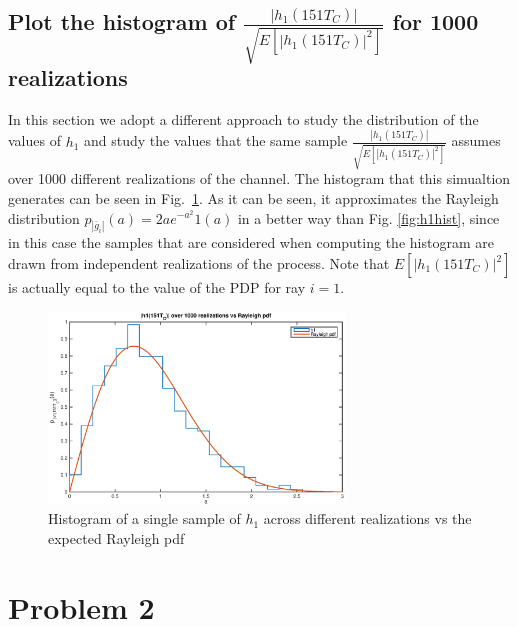 \documentclass[10pt]{article}
\begin{document}
\subsection*{Plot the histogram of $\frac{|h_1(151T_C)|}{\sqrt{E[|h_1(151T_C)|^2]}}$ for 1000 realizations}
In this section we adopt a different approach to study the distribution of the values of $h_1$ and study the values that the same sample $\frac{|h_1(151T_C)|}{\sqrt{E[|h_1(151T_C)|^2]}}$ assumes over 1000 different realizations of the channel. The histogram that this simualtion generates can be seen in Fig.~\ref{fig:h1hist1000realizations}. As it can be seen, it approximates the Rayleigh distribution $p_{|\bar{g}_i|}(a) = 2a e^{-a^2} 1(a)$ in a better way than Fig. \ref{fig:h1hist}, since in this case the samples that are considered when computing the histogram are drawn from independent realizations of the process. Note that $E[|h_1(151T_C)|^2]$ is actually equal to the value of the PDP for ray $i=1$.

\begin{figure}[h!]
  \centering
  \includegraphics[width = 0.7\textwidth]{p03_h1hist}
  \caption{Histogram of a single sample of $h_1$ across different realizations vs the expected Rayleigh pdf}
  \label{fig:h1hist1000realizations}
\end{figure}


\clearpage

\section*{Problem 2}
\end{document}
